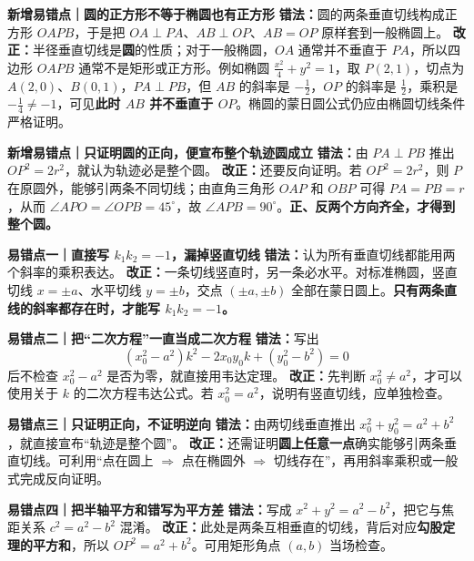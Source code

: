 \begin{trapbox}



  \textbf{\textcolor{CTrap}{新增易错点｜圆的正方形不等于椭圆也有正方形}}
  \textbf{错法：}圆的两条垂直切线构成正方形 $OAPB$，于是把 $OA\perp PA$、$AB\perp OP$、$AB=OP$ 原样套到一般椭圆上。
  \textbf{改正：}半径垂直切线是\textbf{圆}的性质；对于一般椭圆，$OA$ 通常并不垂直于 $PA$，所以四边形 $OAPB$ 通常不是矩形或正方形。例如椭圆 $\frac{x^2}{4}+y^2=1$，取 $P(2,1)$，切点为 $A(2,0)$、$B(0,1)$，$PA\perp PB$，但 $AB$ 的斜率是 $-\frac12$，$OP$ 的斜率是 $\frac12$，乘积是 $-\frac14\ne-1$，可见\textbf{此时 $AB$ 并不垂直于 $OP$}。椭圆的蒙日圆公式仍应由椭圆切线条件严格证明。

  \medskip
  \textbf{\textcolor{CTrap}{新增易错点｜只证明圆的正向，便宣布整个轨迹圆成立}}
  \textbf{错法：}由 $PA\perp PB$ 推出 $OP^2=2r^2$，就认为轨迹必是整个圆。
  \textbf{改正：}还要反向证明。若 $OP^2=2r^2$，则 $P$ 在原圆外，能够引两条不同切线；由直角三角形 $OAP$ 和 $OBP$ 可得 $PA=PB=r$，从而 $\angle APO=\angle OPB=45^\circ$，故 $\angle APB=90^\circ$。\textbf{正、反两个方向齐全，才得到整个圆。}

  \medskip
  \textbf{\textcolor{CTrap}{易错点一｜直接写 $k_1k_2=-1$，漏掉竖直切线}}
  \textbf{错法：}认为所有垂直切线都能用两个斜率的乘积表达。
  \textbf{改正：}一条切线竖直时，另一条必水平。对标准椭圆，竖直切线 $x=\pm a$、水平切线 $y=\pm b$，交点 $(\pm a,\pm b)$ 全部在蒙日圆上。\textbf{只有两条直线的斜率都存在时，才能写 $k_1k_2=-1$。}

  \medskip
  \textbf{\textcolor{CTrap}{易错点二｜把“二次方程”一直当成二次方程}}
  \textbf{错法：}写出
  \[
    (x_0^2-a^2)k^2-2x_0y_0k+(y_0^2-b^2)=0
  \]
  后不检查 $x_0^2-a^2$ 是否为零，就直接用韦达定理。
  \textbf{改正：}先判断 $x_0^2\ne a^2$，才可以使用关于 $k$ 的二次方程韦达公式。若 $x_0^2=a^2$，说明有竖直切线，应单独检查。

  \medskip
  \textbf{\textcolor{CTrap}{易错点三｜只证明正向，不证明逆向}}
  \textbf{错法：}由两切线垂直推出 $x_0^2+y_0^2=a^2+b^2$，就直接宣布“轨迹是整个圆”。
  \textbf{改正：}还需证明\textbf{圆上任意一点}确实能够引两条垂直切线。可利用“点在圆上 $\Rightarrow$ 点在椭圆外 $\Rightarrow$ 切线存在”，再用斜率乘积或一般式完成反向证明。

  \medskip
  \textbf{\textcolor{CTrap}{易错点四｜把半轴平方和错写为平方差}}
  \textbf{错法：}写成 $x^2+y^2=a^2-b^2$，把它与焦距关系 $c^2=a^2-b^2$ 混淆。
  \textbf{改正：}此处是两条互相垂直的切线，背后对应\textbf{勾股定理的平方和}，所以 $OP^2=a^2+b^2$。可用矩形角点 $(a,b)$ 当场检查。


\end{trapbox}
